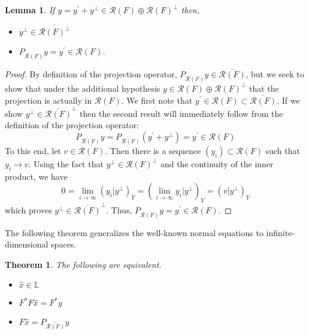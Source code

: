 \documentclass[12pt]{article}
\newcommand{\R}{\mathcal{R}}
\newtheorem{lemma}{Lemma}
\newtheorem{thm}{Theorem}
\begin{document}
\begin{lemma} \label{range_lemma}
If $y = y^\prime + y^\perp \in \R(F) \oplus \R(F)^\perp$ then, 
\begin{itemize} 
\item $y^\perp \in \overline{\R(F)^\perp}$
\item $P_{\overline{\R(F)}} y = y^\prime \in \R(F)$. 
\end{itemize} 
\end{lemma} 

\begin{proof} 
By definition of the projection operator, $P_{\overline{\R(F)}} y \in \overline{\R(F)}$, but we seek to show that under the 
additional hypothesis $y \in \R(F) \oplus \R(F)^\perp$ that the projection is actually in $\R(F)$. We first note that 
$y^\prime \in \R(F) \subset \overline{\R(F)}$. If we show $y^\perp \in \overline{\R(F)}^\perp$ then the second result will immediately 
follow from the definition of the projection operator: 
\[P_{\overline{\R(F)}} y = P_{\overline{\R(F)}} (y^\prime + y^\perp) = y^\prime \in \R(F)\]
To this end, let $v \in \overline{\R(F)}$. Then there is a sequence $(y_i) \subset \R(F)$ such that $y_i \to v$. Using
the fact that $y^\perp \in \R(F)^\perp$ and the continuity of the inner product, we have 
\[0 = \lim_{i \to \infty} (y_i|y^\perp)_Y = (\lim_{i \to \infty} y_i|y^\perp)_Y = (v|y^\perp)_Y\]
which proves $y^\perp \in \overline{\R(F)}^\perp$. Thus, $P_{\overline{\R(F)}} y = y^\prime \in \R(F)$.
\end{proof} 

The following theorem generalizes the well-known normal equations to infinite-dimensional spaces. 

\begin{thm} \label{normal_equations}
The following are equivalent. 
\begin{itemize} 
\item $\hat{x} \in \mathbb{L}$
\item $F^* F\hat{x} = F^* y$
\item $F\hat{x} = P_{\overline{\R(F)}} y$
\end{itemize} 
\end{thm} 
\end{document}
